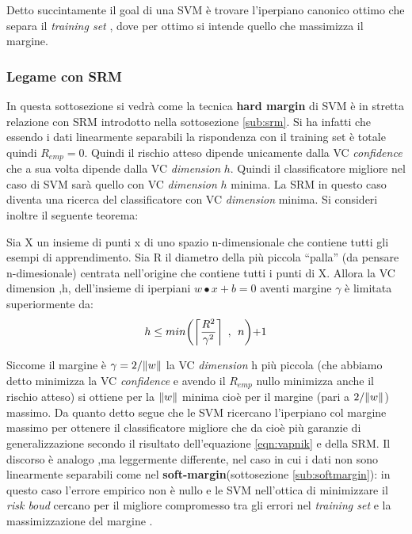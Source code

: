 Detto succintamente il goal di una \ac{SVM} è trovare l'iperpiano canonico ottimo che separa il \textit{training set} , dove per ottimo si intende quello che massimizza il margine.\\

\subsubsection{Legame con SRM}
\label{subsub:lsrm}
In questa sottosezione si vedrà come la tecnica \textbf{hard margin} di \ac{SVM} è in stretta relazione con \ac{SRM} introdotto nella sottosezione \ref{sub:srm}. Si ha infatti che essendo i dati linearmente separabili la rispondenza con il training set è totale quindi $R_{emp}=0$. Quindi il rischio atteso dipende unicamente dalla \ac{VC} \textit{confidence} che a sua volta dipende dalla \ac{VC} \textit{dimension} $h$. Quindi il classificatore migliore nel caso di \ac{SVM} sarà quello con \ac{VC} \textit{dimension} $h$ minima.  La \ac{SRM} in questo caso diventa una ricerca del classificatore con \ac{VC} \textit{dimension} minima. Si consideri inoltre il seguente teorema:
\begin{teorema}
\label{teo:suphdim}
Sia X un insieme di punti x di uno spazio n-dimensionale  che contiene tutti gli esempi di apprendimento. Sia R il diametro della più piccola ``palla'' (da pensare n-dimesionale) centrata nell'origine che contiene tutti i punti di X. Allora la \ac{VC} dimension ,h, dell'insieme di iperpiani $w \bullet x + b = 0$ aventi margine $\gamma$ è limitata superiormente da: 
\begin{equation*}
h \leq min \biggl( \ceil*{\frac{R^{2}}{\gamma^{2}}} \:\:,\:\: n \biggl) + 1
\end{equation*}
\end{teorema}
Siccome il margine è $\gamma = 2/\lVert w\rVert$ la \ac{VC} \textit{dimension} h più piccola (che abbiamo detto minimizza la \ac{VC} \textit{confidence} e avendo il $R_{emp}$ nullo minimizza anche il rischio atteso) si ottiene per la $\lVert w\rVert$ minima cioè per il margine (pari a $2/\lVert w\rVert$) massimo.  Da quanto detto segue che le \ac{SVM} ricercano l'iperpiano col margine massimo per ottenere il classificatore migliore che da cioè più garanzie di generalizzazione secondo il risultato dell'equazione \eqref{eqn:vapnik} e della \ac{SRM}.
Il discorso è analogo ,ma leggermente differente, nel caso in cui i dati non sono linearmente separabili come nel \textbf{soft-margin}(sottosezione \ref{sub:softmargin}): in questo caso l'errore empirico non è nullo e le \ac{SVM}  nell'ottica di minimizzare il \textit{risk boud} cercano per il migliore compromesso tra gli errori nel \textit{training set} e la massimizzazione del margine .

